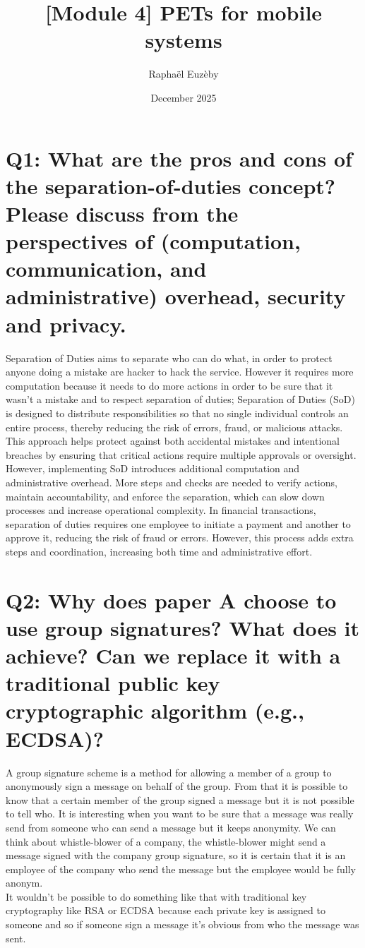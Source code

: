 \documentclass{article}
\title{[Module 4] PETs for mobile systems}
\author{Raphaël Euzèby}
\date{December 2025}
\begin{document}
\maketitle


\section*{
Q1: What are the pros and cons of the separation-of-duties concept? Please discuss from the perspectives of (computation, communication, and administrative) overhead, security and privacy.
}

Separation of Duties aims to separate who can do what, in order to protect anyone doing a mistake are hacker to hack the service.
However it requires more computation because it needs to do more actions in order to be sure that it wasn't a mistake and to respect separation of duties; 
Separation of Duties (SoD) is designed to distribute responsibilities so that no single individual controls an entire process, thereby reducing the risk of errors, fraud, or malicious attacks. This approach helps protect against both accidental mistakes and intentional breaches by ensuring that critical actions require multiple approvals or oversight.
However, implementing SoD introduces additional computation and administrative overhead. More steps and checks are needed to verify actions, maintain accountability, and enforce the separation, which can slow down processes and increase operational complexity.
In financial transactions, separation of duties requires one employee to initiate a payment and another to approve it, reducing the risk of fraud or errors. However, this process adds extra steps and coordination, increasing both time and administrative effort.

\section*{
Q2: Why does paper A choose to use group signatures? What does it achieve? Can we replace it with a traditional public key cryptographic algorithm (e.g., ECDSA)?
}

A group signature scheme is a method for allowing a member of a group to anonymously sign a message on behalf of the group. From that it is possible to know that a certain member of the group signed a message but it is not possible to tell who. It is interesting when you want to be sure that a message was really send from someone who can send a message but it keeps anonymity. We can think about whistle-blower of a company, the whistle-blower might send a message signed with the company group signature, so it is certain that it is an employee of the company who send the message but the employee would be fully anonym.  \\
It wouldn't be possible to do something like that with traditional key cryptography like RSA or ECDSA because each private key is assigned to someone and so if someone sign a message it's obvious from who the message was sent.
\end{document}
